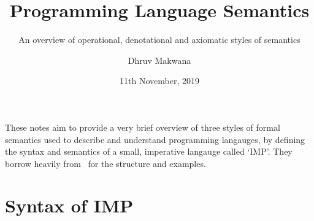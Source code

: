 \usepackage{proof}
\usepackage{ebproof}

\title{Programming Language Semantics}
\subtitle{An overview of operational, denotational and axiomatic styles of semantics}
\date{11th November, 2019}
\author{Dhruv Makwana}

\graphicspath{{./graphics/}}


\addtolength{\jot}{\baselineskip}



\maketitle

\mode*  %


These notes aim to provide a very brief overview of three styles of formal
semantics used to describe and understand programming langauges, by
defining the syntax and semantics of a small, imperative langauge called `IMP'.
They borrow heavily from~\citet{winskel1993formal} for the structure and
examples.

\section{Syntax of IMP}

